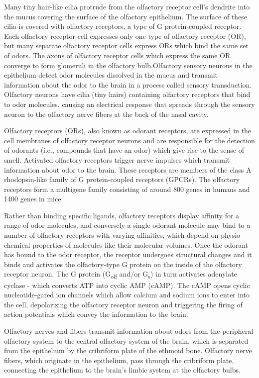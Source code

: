 \documentclass[]{book}
\begin{document}
Many tiny hair-like cilia protrude from the olfactory receptor cell's dendrite into the mucus covering the surface of the olfactory epithelium. The surface of these cilia is covered with olfactory receptors, a type of G protein-coupled receptor. Each olfactory receptor cell expresses only one type of olfactory receptor (OR), but many separate olfactory receptor cells express ORs which bind the same set of odors. The axons of olfactory receptor cells which express the same OR converge to form glomeruli in the olfactory bulb.Olfactory sensory neurons in the epithelium detect odor molecules dissolved in the mucus and transmit information about the odor to the brain in a process called sensory transduction. Olfactory neurons have cilia (tiny hairs) containing olfactory receptors that bind to odor molecules, causing an electrical response that spreads through the sensory neuron to the olfactory nerve fibers at the back of the nasal cavity.

Olfactory receptors (ORs), also known as odorant receptors, are expressed in the cell membranes of olfactory receptor neurons and are responsible for the detection of odorants (i.e., compounds that have an odor) which give rise to the sense of smell. Activated olfactory receptors trigger nerve impulses which transmit information about odor to the brain. These receptors are members of the class A rhodopsin-like family of G protein-coupled receptors (GPCRs). The olfactory receptors form a multigene family consisting of around 800 genes in humans and 1400 genes in mice

Rather than binding specific ligands, olfactory receptors display affinity for a range of odor molecules, and conversely a single odorant molecule may bind to a number of olfactory receptors with varying affinities, which depend on physio-chemical properties of molecules like their molecular volumes. Once the odorant has bound to the odor receptor, the receptor undergoes structural changes and it binds and activates the olfactory-type G protein on the inside of the olfactory receptor neuron. The G protein (G\textsubscript{olf} and/or G\textsubscript{s}) in turn activates adenylate cyclase - which converts ATP into cyclic AMP (cAMP). The cAMP opens cyclic nucleotide-gated ion channels which allow calcium and sodium ions to enter into the cell, depolarizing the olfactory receptor neuron and triggering the firing of action potentials which convey the information to the brain.

Olfactory nerves and fibers transmit information about odors from the peripheral olfactory system to the central olfactory system of the brain, which is separated from the epithelium by the cribriform plate of the ethmoid bone. Olfactory nerve fibers, which originate in the epithelium, pass through the cribriform plate, connecting the epithelium to the brain's limbic system at the olfactory bulbs.
\end{document}
